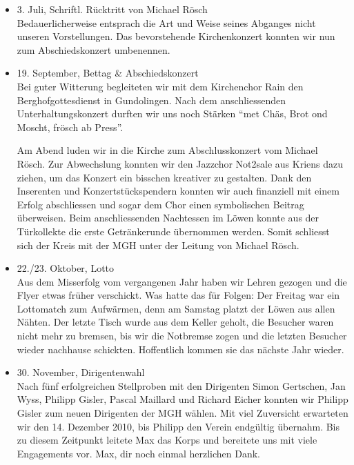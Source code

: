\begin{history}
\begin{itemize}
            \item 3. Juli, Schriftl. Rücktritt von Michael Rösch\\
                  Bedauerlicherweise entsprach die Art und Weise seines Abganges
                  nicht unseren Vorstellungen. Das bevorstehende Kirchenkonzert
                  konnten wir nun zum Abschiedskonzert umbenennen.

            \item 19. September, Bettag \& Abschiedskonzert\\
                  Bei guter Witterung begleiteten wir mit dem Kirchenchor Rain den
                  Berghofgottesdienst in Gundolingen. Nach dem anschliessenden
                  Unterhaltungskonzert durften wir uns noch Stärken \enquote{met
                        Chäs, Brot ond Moscht, frösch ab Press}.

                  Am Abend luden wir in die Kirche zum Abschlusskonzert vom Michael
                  Rösch. Zur Abwechslung konnten wir den Jazzchor Not2sale aus
                  Kriens dazu ziehen, um das Konzert ein bisschen kreativer zu
                  gestalten. Dank den Inserenten und Konzertstückspendern konnten
                  wir auch finanziell mit einem Erfolg abschliessen und sogar dem
                  Chor einen symbolischen Beitrag überweisen. Beim anschliessenden
                  Nachtessen im Löwen konnte aus der Türkollekte die erste
                  Getränkerunde übernommen werden. Somit schliesst sich der Kreis
                  mit der MGH unter der Leitung von Michael Rösch.

            \item 22./23. Oktober, Lotto\\
                  Aus dem Misserfolg vom vergangenen Jahr haben wir Lehren gezogen
                  und die Flyer etwas früher verschickt. Was hatte das für Folgen:
                  Der Freitag war ein Lottomatch zum Aufwärmen, denn am Samstag
                  platzt der Löwen aus allen Nähten. Der letzte Tisch wurde aus dem
                  Keller geholt, die Besucher waren nicht mehr zu bremsen, bis wir
                  die Notbremse zogen und die letzten Besucher wieder nachhause
                  schickten. Hoffentlich kommen sie das nächste Jahr wieder.

            \item 30. November, Dirigentenwahl\\
                  Nach fünf erfolgreichen Stellproben mit den Dirigenten Simon
                  Gertschen, Jan Wyss, Philipp Gisler, Pascal Maillard und Richard
                  Eicher konnten wir Philipp Gisler zum neuen Dirigenten der MGH
                  wählen. Mit viel Zuversicht erwarteten wir den 14. Dezember 2010,
                  bis Philipp den Verein endgültig übernahm. Bis zu diesem Zeitpunkt
                  leitete Max das Korps und bereitete uns mit viele Engagements vor.
                  Max, dir noch einmal herzlichen Dank.


\end{itemize}
\end{history}
